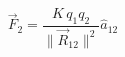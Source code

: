 \documentclass[preview]{standalone}
\begin{document}
\begin{align*}
\vec{F}_2 = \dfrac{K \, q_1 q_2}{\lVert \vec{R}_{12} \rVert^2} \hat{a}_{12}
\end{align*}
\end{document}
